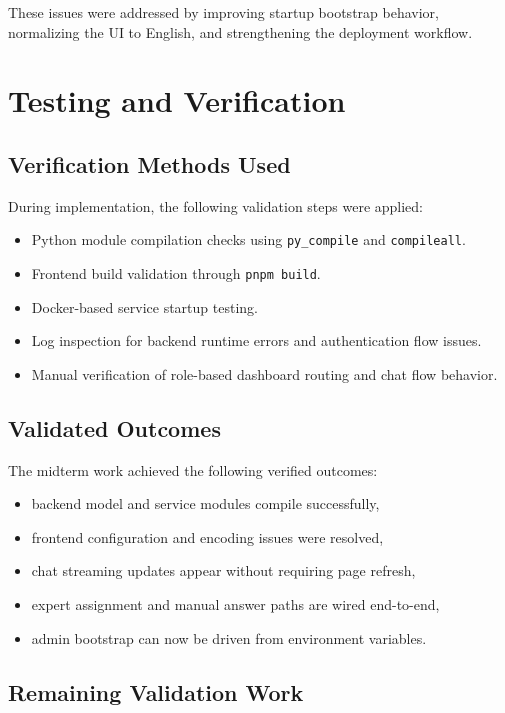 \documentclass[12pt,a4paper]{report}
\begin{document}
These issues were addressed by improving startup bootstrap behavior, normalizing the UI to English, and strengthening the deployment workflow.

\chapter{Testing and Verification}

\section{Verification Methods Used}

During implementation, the following validation steps were applied:
\begin{itemize}[leftmargin=1.5em]
\item Python module compilation checks using \texttt{py\_compile} and \texttt{compileall}.
\item Frontend build validation through \texttt{pnpm build}.
\item Docker-based service startup testing.
\item Log inspection for backend runtime errors and authentication flow issues.
\item Manual verification of role-based dashboard routing and chat flow behavior.
\end{itemize}

\section{Validated Outcomes}

The midterm work achieved the following verified outcomes:
\begin{itemize}[leftmargin=1.5em]
\item backend model and service modules compile successfully,
\item frontend configuration and encoding issues were resolved,
\item chat streaming updates appear without requiring page refresh,
\item expert assignment and manual answer paths are wired end-to-end,
\item admin bootstrap can now be driven from environment variables.
\end{itemize}

\section{Remaining Validation Work}
\end{document}
